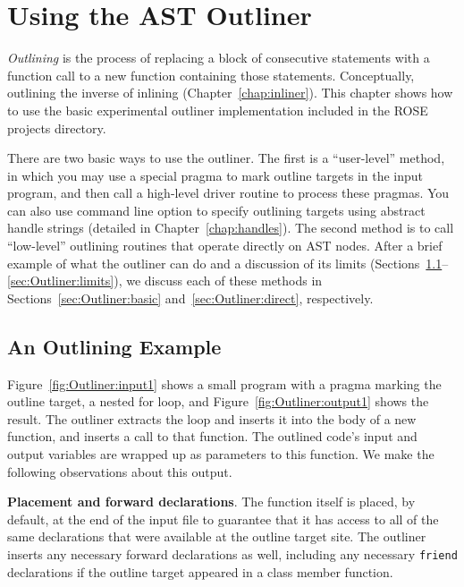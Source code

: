 \chapter{Using the AST Outliner}
\label{chap:outliner}

\emph{Outlining} is the process of replacing a block of
consecutive statements with a function call to a new function
containing those statements. Conceptually, outlining the inverse of
inlining (Chapter~\ref{chap:inliner}). This chapter shows how to use
the basic experimental outliner implementation included in the ROSE projects
directory.

There are two basic ways to use the outliner. The first is a
``user-level'' method, in which you may use a special pragma to mark
outline targets in the input program, and then call a high-level
driver routine to process these pragmas. 
You can also use command line option to specify outlining targets using
abstract handle strings (detailed in Chapter~\ref{chap:handles}). 
The second method is to call
``low-level'' outlining routines that operate directly on AST nodes.
After a brief example of what the outliner can do and a discussion
of its limits
(Sections~\ref{sec:Outliner:example}--\ref{sec:Outliner:limits}),
we discuss each of these methods in
Sections~\ref{sec:Outliner:basic} and~\ref{sec:Outliner:direct},
respectively.

\section{An Outlining Example}
\label{sec:Outliner:example}

Figure~\ref{fig:Outliner:input1} shows a small program with a
pragma marking the outline target, a nested for loop, and
Figure~\ref{fig:Outliner:output1} shows the result. The outliner
extracts the loop and inserts it into the body of a new function, and
inserts a call to that function. The outlined code's input and output
variables are wrapped up as parameters to this function. We make the
following observations about this output.

\textbf{Placement and forward declarations}. The function itself is
placed, by default, at the end of the input file to guarantee that it
has access to all of the same declarations that were available at the
outline target site. The outliner inserts any necessary forward
declarations as well, including any necessary \texttt{friend}
declarations if the outline target appeared in a class member
function.

